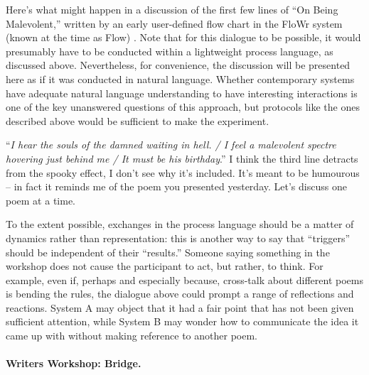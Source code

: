 \documentclass{llncs}
\begin{document}
Here's what might happen in a discussion of the first few lines of
``On Being Malevolent,'' written by an early user-defined flow chart
in the {\sf FloWr} system (known at the time as {\sf Flow})
\cite{colton-flowcharting}.  Note that for this dialogue to be
possible, it would presumably have to be conducted within a
lightweight process language, as discussed above.  Nevertheless, for
convenience, the discussion will be presented here as if it was
conducted in natural language.  Whether contemporary systems have
adequate natural language understanding to have interesting
interactions is one of the key unanswered questions of this approach,
but protocols like the ones described above would be sufficient to
make the experiment.

\begin{center}
\begin{minipage}{.9\textwidth}
\begin{dialogue}
 ``\emph{I hear the souls of the
  damned waiting in hell. / I feel a malevolent
  spectre hovering just behind me / It must be
  his birthday}.''
%
 I think the third line detracts
from the spooky effect, I don't see why it's
included.
%
 It's meant to be humourous -- in fact it reminds me
of the poem you presented yesterday.
%
 Let's discuss one poem at a
time.
\end{dialogue}
\end{minipage}
\end{center}

To the extent possible, exchanges in the process language should be a
matter of dynamics rather than representation: this is another way to
say that ``triggers'' should be independent of their ``results.''
Someone saying something in the workshop does not cause the
participant to act, but rather, to think.  
%
For example, even if, perhaps and especially because, cross-talk about
different poems is bending the rules, the dialogue above could prompt
a range of reflections and reactions.  System A may object that it had
a fair point that has not been given sufficient attention, while
System B may wonder how to communicate the idea it came up with
without making reference to another poem.

\paragraph{Writers Workshop: Bridge.}
\end{document}
